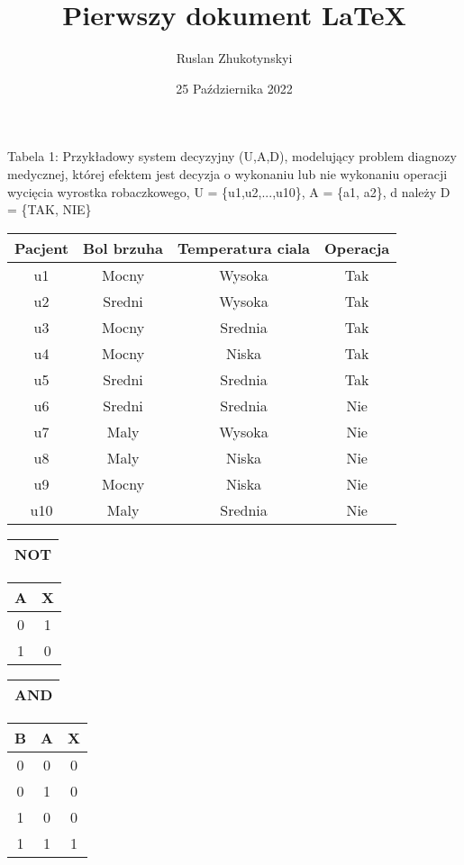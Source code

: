 \documentclass[12pt, letterpaper, titlepage]{article}
\title{Pierwszy dokument LaTeX}
\author{Ruslan Zhukotynskyi}
\date{25 Października 2022}
\begin{document}
\maketitle
Tabela 1: Przykładowy system decyzyjny (U,A,D), modelujący problem diagnozy medycznej, której efektem jest decyzja o wykonaniu lub nie wykonaniu operacji wycięcia wyrostka robaczkowego, U = \{u1,u2,...,u10\}, A = \{a1, a2\}, d należy D = \{TAK, NIE\} 
\begin{center}
\begin{tabular}{ c| c c c }
\hline
Pacjent & Bol brzuha & Temperatura ciala & Operacja \\
\hline
u1 & Mocny & Wysoka & Tak \\
u2 & Sredni & Wysoka & Tak \\
u3 & Mocny & Srednia & Tak \\
u4 & Mocny & Niska & Tak \\
u5 & Sredni & Srednia & Tak \\
u6 & Sredni & Srednia & Nie \\
u7 & Maly & Wysoka & Nie \\
u8 & Maly & Niska & Nie \\
u9 & Mocny & Niska & Nie \\
u10 & Maly & Srednia & Nie \\
\hline
\end{tabular}
\end{center}
\newpage
\begin{center}
\begin{tabular}{ |c| }
\hline
NOT \\
\hline
\end{tabular}
\end{center}
\begin{center}
\begin{tabular}{ |c|c| }
\hline
A & X \\
\hline
0 & 1 \\
\hline
1 & 0 \\
\hline
\end{tabular}
\end{center}
\begin{center}
\begin{tabular}{ |c| }
\hline
AND \\
\hline
\end{tabular}
\end{center}
\begin{center}
\begin{tabular}{ |c|c|c| }
\hline
B & A & X \\
\hline
0 & 0 & 0 \\
0 & 1 & 0 \\
1 & 0 & 0 \\
1 & 1 & 1 \\
\hline
\end{tabular}
\end{center}
\end{document}
